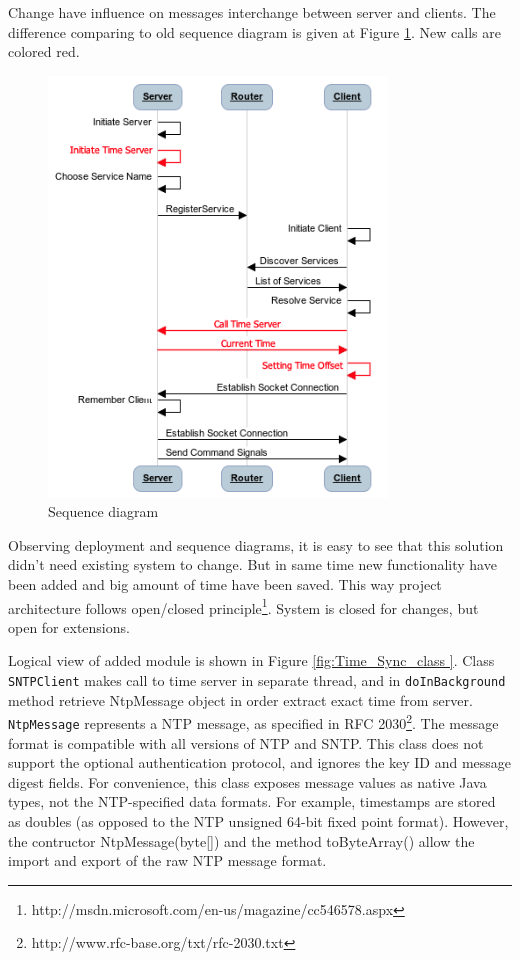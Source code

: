 Change have influence on messages interchange between server and clients. The difference comparing to old sequence diagram is given at Figure \ref{fig:sprint5_sequence_diagram}. New calls are colored red. 

\begin{figure}[H]
	\centering
		\includegraphics[width=9cm]{sprint5/communication}
	\caption{Sequence diagram}
	\label{fig:sprint5_sequence_diagram}
\end{figure}

Observing deployment and sequence diagrams, it is easy to see that this solution didn't need existing system to change. But in same time new functionality have been added and big amount of time have been saved. This way project architecture follows open/closed principle\footnote{http://msdn.microsoft.com/en-us/magazine/cc546578.aspx}. System is closed for changes, but open for extensions.



Logical view of added module is shown in Figure \ref{fig:Time_Sync_class }. Class \texttt{SNTPClient} makes call to time server in separate thread, and in \texttt{doInBackground} method retrieve NtpMessage object in order extract exact time from server. \texttt{NtpMessage} represents a NTP message, as specified in RFC 2030\footnote{http://www.rfc-base.org/txt/rfc-2030.txt}. The message format is compatible with all versions of NTP and SNTP. This class does not support the optional authentication protocol, and ignores the key ID and message digest fields. For convenience, this class exposes message values as native Java types, not the NTP-specified data formats. For example, timestamps are stored as doubles (as opposed to the NTP unsigned 64-bit fixed point format). However, the contructor NtpMessage(byte[]) and the method toByteArray() allow the import and export of the raw NTP message format.



